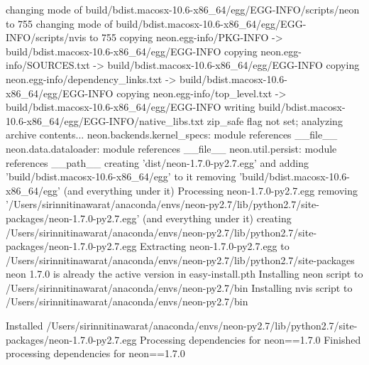 changing mode of build/bdist.macosx-10.6-x86_64/egg/EGG-INFO/scripts/neon to 755
changing mode of build/bdist.macosx-10.6-x86_64/egg/EGG-INFO/scripts/nvis to 755
copying neon.egg-info/PKG-INFO -> build/bdist.macosx-10.6-x86_64/egg/EGG-INFO
copying neon.egg-info/SOURCES.txt -> build/bdist.macosx-10.6-x86_64/egg/EGG-INFO
copying neon.egg-info/dependency_links.txt -> build/bdist.macosx-10.6-x86_64/egg/EGG-INFO
copying neon.egg-info/top_level.txt -> build/bdist.macosx-10.6-x86_64/egg/EGG-INFO
writing build/bdist.macosx-10.6-x86_64/egg/EGG-INFO/native_libs.txt
zip_safe flag not set; analyzing archive contents...
neon.backends.kernel_specs: module references __file__
neon.data.dataloader: module references __file__
neon.util.persist: module references __path__
creating 'dist/neon-1.7.0-py2.7.egg' and adding 'build/bdist.macosx-10.6-x86_64/egg' to it
removing 'build/bdist.macosx-10.6-x86_64/egg' (and everything under it)
Processing neon-1.7.0-py2.7.egg
removing '/Users/sirinnitinawarat/anaconda/envs/neon-py2.7/lib/python2.7/site-packages/neon-1.7.0-py2.7.egg' (and everything under it)
creating /Users/sirinnitinawarat/anaconda/envs/neon-py2.7/lib/python2.7/site-packages/neon-1.7.0-py2.7.egg
Extracting neon-1.7.0-py2.7.egg to /Users/sirinnitinawarat/anaconda/envs/neon-py2.7/lib/python2.7/site-packages
neon 1.7.0 is already the active version in easy-install.pth
Installing neon script to /Users/sirinnitinawarat/anaconda/envs/neon-py2.7/bin
Installing nvis script to /Users/sirinnitinawarat/anaconda/envs/neon-py2.7/bin

Installed /Users/sirinnitinawarat/anaconda/envs/neon-py2.7/lib/python2.7/site-packages/neon-1.7.0-py2.7.egg
Processing dependencies for neon==1.7.0
Finished processing dependencies for neon==1.7.0

